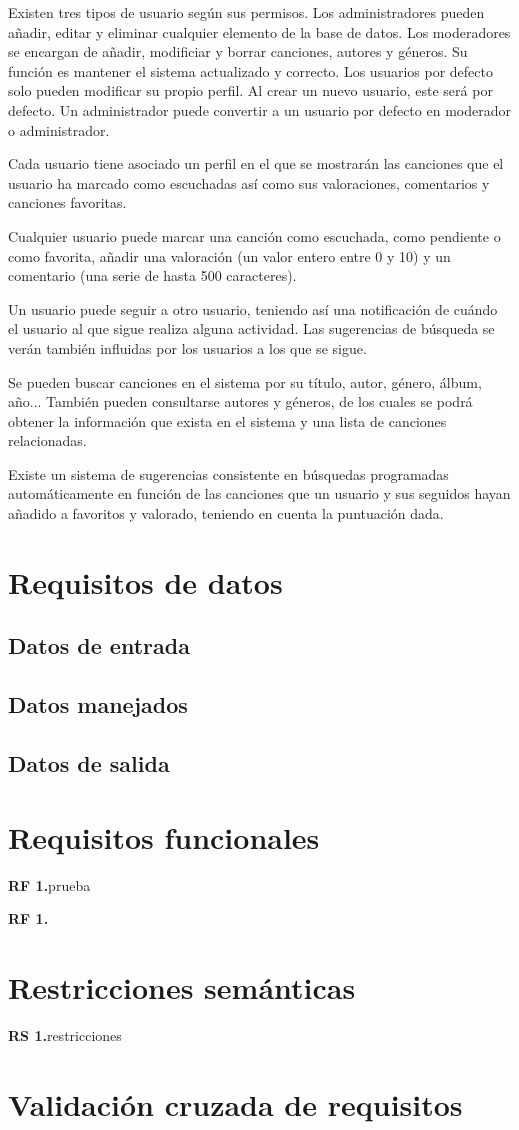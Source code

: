 \documentclass[11pt,a4paper]{article}
\newcounter{RFuCounter} %
\newcommand{\rfu}[1]{\addtocounter{RFuCounter}{1}\textbf{\rmfamily RF 1.\theRFuCounter}\quad#1\\}
\newcounter{RSuCounter} %
\newcommand{\rsu}[1]{\addtocounter{RSuCounter}{1}\textbf{\rmfamily RS 1.\theRSuCounter}\quad#1\\}
\begin{document}
Existen tres tipos de usuario según sus permisos. Los administradores pueden añadir, editar y eliminar cualquier elemento de la base de datos. Los moderadores se encargan de añadir, modificiar y borrar canciones, autores y géneros. Su función es mantener el sistema actualizado y correcto. Los usuarios por defecto solo pueden modificar su propio perfil. Al crear un nuevo usuario, este será por defecto. Un administrador puede convertir a un usuario por defecto en moderador o administrador.

Cada usuario tiene asociado un perfil en el que se mostrarán las canciones que el usuario ha marcado como escuchadas así como sus valoraciones, comentarios y canciones favoritas. 


Cualquier usuario puede marcar una canción como escuchada, como pendiente o como favorita, añadir una valoración (un valor entero entre 0 y 10) y un comentario (una serie de hasta 500 caracteres). 

Un usuario puede seguir a otro usuario, teniendo así una notificación de cuándo el usuario al que sigue realiza alguna actividad. Las sugerencias de búsqueda se verán también influidas por los usuarios a los que se sigue. 



Se pueden buscar canciones en el sistema por su título, autor, género, álbum, año... También pueden consultarse autores y géneros, de los cuales se podrá obtener la información que exista en el sistema y una lista de canciones relacionadas. 

Existe un sistema de sugerencias consistente en búsquedas programadas automáticamente en función de las canciones que un usuario y sus seguidos hayan añadido a favoritos y valorado, teniendo en cuenta la puntuación dada.

\section{Requisitos de datos}
\subsection{Datos de entrada}
\subsection{Datos manejados}
\subsection{Datos de salida}

\section{Requisitos funcionales}
\rfu{prueba}
\rfu{2}

\section{Restricciones semánticas}

\rsu{restricciones}

\section{Validación cruzada de requisitos}
\end{document}

